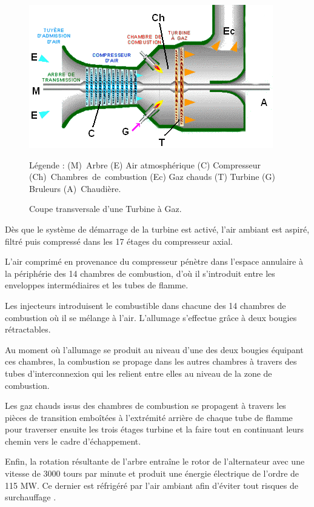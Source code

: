 \begin{figure}[htb]
\centering
\includegraphics[scale=1]{./Figures/coupe_tg.png}
\caption{Coupe transversale d'une Turbine à Gaz.        }
Légende : \hbox{(M) Arbre} (E) Air atmosphérique     (C) Compresseur \hbox{(Ch) Chambres de combustion} (Ec) Gaz chauds  (T) Turbine (G) Bruleurs (A)\hbox{ Chaudière}.
\end{figure}

Dès que le système de démarrage de la turbine est activé, l'air ambiant est aspiré, filtré puis compressé dans les 17 étages du compresseur axial. 
 
L'air comprimé en provenance du compresseur pénètre dans l'espace annulaire à la périphérie des 14 chambres de combustion, d'où il s'introduit entre les enveloppes intermédiaires et les tubes de flamme. 

Les injecteurs introduisent le combustible dans chacune des 14 chambres de combustion où il se mélange à l'air. L'allumage s'effectue grâce à deux bougies rétractables.

Au moment où l'allumage se produit au niveau d'une des deux bougies équipant ces chambres, la combustion se propage dans les autres chambres à travers des tubes d'interconnexion qui les relient entre elles au niveau de la zone de combustion. 

Les gaz chauds issus des chambres de combustion se propagent à travers les pièces de transition emboîtées à l'extrémité arrière de chaque tube de flamme pour traverser ensuite les trois étages turbine et la faire tout en continuant leurs chemin vers le cadre d'échappement. 

Enfin, la rotation résultante de l'arbre entraîne le rotor de l'alternateur avec une vitesse de 3000 tours par minute et produit une énergie électrique de l'ordre de 115 MW. Ce dernier est réfrigéré par l'air ambiant afin d'éviter tout risques de surchauffage \cite{manuel}.

